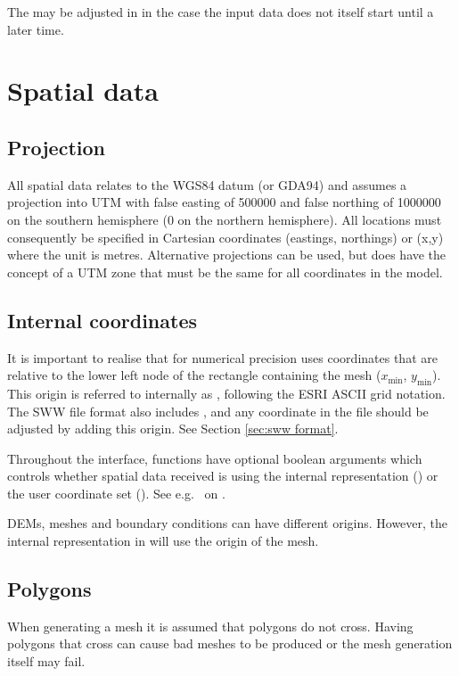 \documentclass{manual}
\begin{document}
The  may be adjusted in  in the case the
input data does not itself start until a later time. 

 
\section{Spatial data}

\subsection{Projection}
All spatial data relates to the WGS84 datum (or GDA94) and assumes a projection
into UTM with false easting of 500000 and false northing of
1000000 on the southern hemisphere (0 on the northern hemisphere). 
All locations must consequently be specified in Cartesian coordinates
(eastings, northings) or (x,y) where the unit is metres.
Alternative projections can be used, but \anuga does have the concept of a UTM zone 
that must be the same for all coordinates in the model.

\subsection{Internal coordinates}
It is important to realise that for numerical precision \anuga uses coordinates that are relative 
to the lower left node of the rectangle containing the mesh ($x_{\mbox{min}}$, $y_{\mbox{min}}$). 
This origin is referred to internally as ,  following the ESRI ASCII grid notation.  
The SWW file format also includes ,  and any coordinate in the file should be adjusted 
by adding this origin. See Section \ref{sec:sww format}.

Throughout the \anuga interface, functions have optional boolean arguments  which controls
whether spatial data received is using the internal representation () or the 
user coordinate set (). See e.g.\  on \pageref{pg:get vertex coordinates}.

DEMs, meshes and boundary conditions can have different origins. However, the internal representation in \anuga 
will use the origin of the mesh.

\subsection{Polygons}
When generating a mesh it is assumed that polygons do not cross.
Having polygons that cross can cause bad meshes to be produced or the mesh generation itself may fail.
\end{document}
